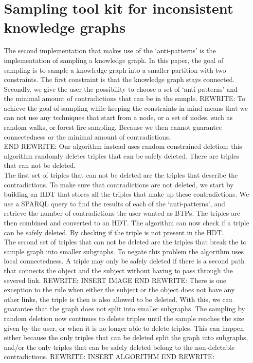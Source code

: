 \documentclass[11pt,letterpaper ,oneside ]{book}
\begin{document}
	\section{Sampling tool kit for inconsistent knowledge graphs}
	The second implementation that makes use of the `anti-patterns' is the implementation of sampling a knowledge graph. In this paper, the goal of sampling is to sample a knowledge graph into a smaller partition with two constraints. The first constraint is that the knowledge graph stays connected. Secondly, we give the user the possibility to choose a set of `anti-patterns' and the minimal amount of contradictions that can be in the sample.
	REWRITE:
	To achieve the goal of sampling while keeping the constraints in mind means that we can not use any techniques that start from a node, or a set of nodes, such as random walks, or forest fire sampling. Because we then cannot guarantee connectedness or the minimal amount of contradictions.\\ 
	END REWRITE:
	Our algorithm instead uses random constrained deletion; this algorithm randomly deletes triples that can be safely deleted. There are triples that can not be deleted.\\
	The first set of triples that can not be deleted are the triples that describe the contradictions. To make sure that contradictions are not deleted, we start by building an HDT\cite{FMPGPA:13}\cite{MPAF:12} that stores all the triples that make up these contradictions. We use a SPARQL query to find the results of each of the `anti-patterns', and retrieve the number of contradictions the user wanted as BTPs. The triples are then combined and converted to an HDT. The algorithm can now check if a triple can be safely deleted. By checking if the triple is not present in the HDT.\\
	The second set of triples that can not be deleted are the triples that break the to sample graph into smaller subgraphs. To negate this problem the algorithm uses local connectedness. A triple may only be safely deleted if there is a second path that connects the object and the subject without having to pass through the severed link.
	REWRITE:
	INSERT IMAGE
	END REWRITE:
	There is one exception to the rule when either the subject or the object does not have any other links, the triple is then is also allowed to be deleted. With this, we can guarantee that the graph does not split into smaller subgraphs. 
	The sampling by random deletion now continues to delete triples until the sample reaches the size given by the user, or when it is no longer able to delete triples. This can happen either because the only triples that can be deleted split the graph into subgraphs, and/or the only triples that can be safely deleted belong to the non-deletable contradictions.
	REWRITE:
	INSERT ALGORITHM
	END REWRITE:
	
\end{document}
